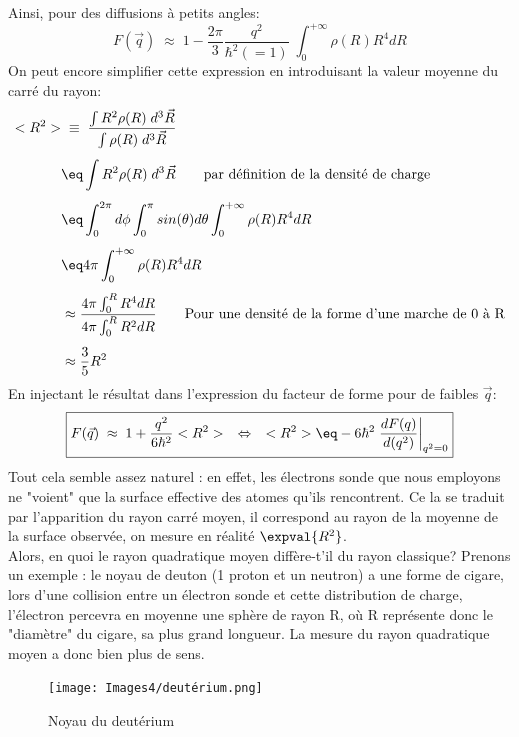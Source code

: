 Ainsi, pour des diffusions à petits angles:
\begin{equation*}
    F(\vec{q}) \;\approx\; 1 - \dfrac{2\pi}{3}\dfrac{q^2}{\hbar^2(=1)} \;\int_0^{+\infty}\rho(R) R^4 dR
\end{equation*}
On peut encore simplifier cette expression en introduisant la valeur moyenne du carré du rayon:
\begin{align*}
    <R^2> &\;\equiv\;
    \dfrac{ \int R^2 \rho(R) \; d^3\vec{R} }{ \int \rho(R) \; d^3\vec{R} }\\[4pt]
    &\eq
    \int R^2 \rho(R) \; d^3\vec{R}
    \qquad \text{par définition de la densité de charge}\\[4pt]
    &\eq
    \int_0^{2\pi}d\phi \int_0^{\pi} sin(\theta) d\theta \int_0^{+\infty}\rho(R) R^4dR\\[4pt]
    &\eq 
    4\pi \int_0^{+\infty}\rho(R) R^4dR\\[4pt]
    &\approx \frac{4\pi\int_0^R R^4dR}{4\pi\int_0^R R^2dR} \qquad \text{Pour une densité de la forme d'une marche de 0 à R}\\[4pt]
    &\approx \frac{3}{5}R^2
\end{align*}
En injectant le résultat dans l'expression du facteur de forme pour de faibles $\vec{q}$:
\begin{equation}
    \boxed{
    F(\vec{q}) \;\approx\; 1 + \dfrac{q^2}{6\hbar^2} <R^2>
    \quad \Leftrightarrow \quad
    <R^2> \eq -6\hbar^2 \left. \dfrac{dF(q)}{d(q^2)}\right|_{q^2=0}
    }
    \label{deriv_fact_forme}
\end{equation}
Tout cela semble assez naturel :  en effet, les électrons sonde que nous employons ne "voient" que la surface effective des atomes qu'ils rencontrent. Ce la se traduit par l'apparition du rayon carré moyen, il correspond au rayon de la moyenne de la surface observée, on mesure en réalité $\expval{R^2}$.\\
Alors, en quoi le rayon quadratique moyen diffère-t'il du rayon classique? Prenons un exemple : le noyau de deuton (1 proton et un neutron) a une forme de cigare, lors d'une collision entre un électron sonde et cette distribution de charge, l'électron percevra en moyenne une sphère de rayon R, où R représente donc le "diamètre" du cigare, sa plus grand longueur. La mesure du rayon quadratique moyen a donc bien plus de sens.\\
\begin{figure}[H]
    \centering
    \texttt{[image: Images4/deutérium.png]}
    \caption{Noyau du deutérium}
\end{figure}
